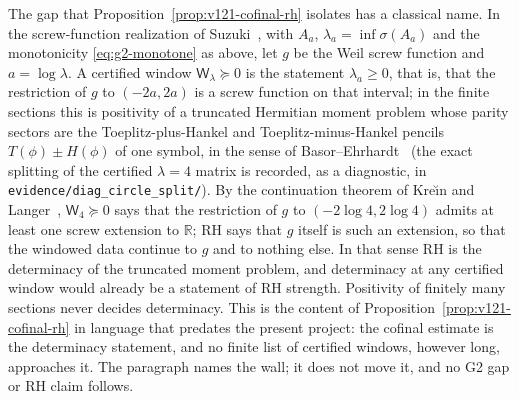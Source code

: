 
The gap that Proposition~\ref{prop:v121-cofinal-rh} isolates has a
classical name. In the screw-function realization of
Suzuki~\cite{Suzuki2026}, with $A_a$, $\lambda_a=\inf\sigma(A_a)$ and
the monotonicity \eqref{eq:g2-monotone} as above, let $g$ be the Weil
screw function and $a=\log\lambda$. A certified window
$\mathsf W_\lambda\succeq0$ is the statement $\lambda_a\ge0$, that is,
that the restriction of $g$ to $(-2a,2a)$ is a screw function on that
interval; in the finite sections this is positivity of a truncated
Hermitian moment problem whose parity sectors are the
Toeplitz-plus-Hankel and Toeplitz-minus-Hankel pencils $T(\phi)\pm H(\phi)$
of one symbol, in the sense of Basor--Ehrhardt~\cite{BasorEhrhardt2002}
(the exact splitting of the certified $\lambda=4$ matrix is recorded, as
a diagnostic, in \texttt{evidence/diag\_circle\_split/}). By the
continuation theorem of Kre\u{\i}n and Langer~\cite{KreinLanger2014},
$\mathsf W_4\succeq0$ says that the restriction of $g$ to
$(-2\log4,2\log4)$ admits at least one screw extension to $\mathbb R$;
RH says that $g$ itself is such an extension, so that the windowed data
continue to $g$ and to nothing else. In that sense RH is the
determinacy of the truncated moment problem, and determinacy at any
certified window would already be a statement of RH strength.
Positivity of finitely many sections never decides determinacy. This
is the content of Proposition~\ref{prop:v121-cofinal-rh} in language
that predates the present project: the cofinal estimate is the
determinacy statement, and no finite list of certified windows, however
long, approaches it. The paragraph names the wall; it does not move
it, and no G2 gap or RH claim follows.
